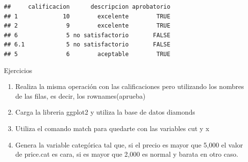 \documentclass[]{article}
\newenvironment{Shaded}{\begin{snugshade}}{\end{snugshade}}
\newcommand{\KeywordTok}[1]{\textcolor[rgb]{0.13,0.29,0.53}{\textbf{{#1}}}}
\newcommand{\DataTypeTok}[1]{\textcolor[rgb]{0.13,0.29,0.53}{{#1}}}
\newcommand{\DecValTok}[1]{\textcolor[rgb]{0.00,0.00,0.81}{{#1}}}
\newcommand{\StringTok}[1]{\textcolor[rgb]{0.31,0.60,0.02}{{#1}}}
\newcommand{\NormalTok}[1]{{#1}}
\begin{document}
\begin{Shaded}
\end{Shaded}

\begin{verbatim}
##     calificacion      descripcion aprobatorio
## 1             10        excelente        TRUE
## 2              9        excelente        TRUE
## 6              5 no satisfactorio       FALSE
## 6.1            5 no satisfactorio       FALSE
## 5              6        aceptable        TRUE
\end{verbatim}

\renewcommand\bcStyleTitre[1]{\large\textcolor{bbblack}{#1}}

\begin{bclogo}[
  couleur=llred,
  arrondi=0,
  logo=\bcstop,
  barre=none,
  noborder=true]{Ejercicios}
\begin{enumerate}
\item Realiza la misma operación con las calificaciones pero utilizando los 
nombres de las filas, es decir, los rownames(aprueba)
\item Carga la libreria ggplot2 y utiliza la base de datos diamonds
\item Utiliza el comando match para quedarte con las variables cut y x 
\item Genera la variable categórica tal que, si el precio es mayor que 5,000 el 
valor de price.cat es cara, si es mayor que 2,000 es normal y barata en otro caso.
\end{enumerate}
\end{bclogo}
\end{document}
